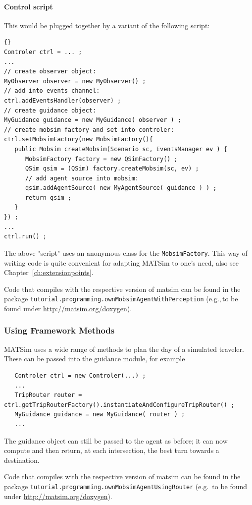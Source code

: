 \paragraph{Control script}

This would be plugged together by a variant of the following script:
\begin{lstlisting}[basicstyle=\footnotesize\tt]{}
Controler ctrl = ... ;
...
// create observer object:
MyObserver observer = new MyObserver() ;
// add into events channel:
ctrl.addEventsHandler(observer) ;
// create guidance object:
MyGuidance guidance = new MyGuidance( observer ) ;
// create mobsim factory and set into controler:
ctrl.setMobsimFactory(new MobsimFactory(){
   public Mobsim createMobsim(Scenario sc, EventsManager ev ) {
      MobsimFactory factory = new QSimFactory() ; 
      QSim qsim = (QSim) factory.createMobsim(sc, ev) ;
      // add agent source into mobsim:
      qsim.addAgentSource( new MyAgentSource( guidance ) ) ;
      return qsim ;
   }
}) ;
...
ctrl.run() ;
\end{lstlisting}
The above "script" uses an anonymous class for the \lstinline$MobsimFactory$.  This way of writing code is quite convenient for adapting MATSim to one's need, also see Chapter~\ref{ch:extensionpoints}.

Code that compiles with the respective version of \acrshort{matsim} can be found in the package \lstinline$tutorial.programming.ownMobsimAgentWithPerception$ (e.g.,\,to be found under \url{http://matsim.org/doxygen}).

\subsubsection{Using Framework Methods}

MATSim uses a wide range of methods to plan the day of a simulated traveler. These can be passed into the guidance module, for example
\begin{lstlisting}
   Controler ctrl = new Controler(...) ;
   ...
   TripRouter router = ctrl.getTripRouterFactory().instantiateAndConfigureTripRouter() ;
   MyGuidance guidance = new MyGuidance( router ) ;
   ...
\end{lstlisting}
The guidance object can still be passed to the agent as before; it can now compute and then return, at each intersection, the best turn towards a destination.

Code that compiles with the respective version of \acrshort{matsim} can be found in the package \lstinline$tutorial.programming.ownMobsimAgentUsingRouter$ (e.g.\ to be found under \url{http://matsim.org/doxygen}).

